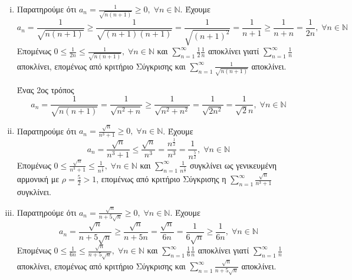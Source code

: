 \begin{enumerate}
\begin{enumerate}[i)]
        \item Παρατηρούμε ότι $ a_{n} = \frac{1}{\sqrt{n(n+1)}} \geq 0, \; \forall n 
            \in \mathbb{N} $. Έχουμε
            \[
                a_{n} = \frac{1}{\sqrt{n(n+1)}} \geq \frac{1}{\sqrt{(n+1)(n+1)}} = 
                \frac{1}{\sqrt{(n+1)^{2}} } = \frac{1}{n+1} \geq \frac{1}{n+n} = 
                \frac{1}{2n}, \; \forall n \in \mathbb{N}   
            \] 
            Επομένως $ 0 \leq \frac{1}{2n} \leq \frac{1}{\sqrt{n(n+1)}}, \; 
            \forall n \in \mathbb{N} $ και $ \sum_{n=1}^{\infty} \frac{1}{2} 
            \frac{1}{n} $ αποκλίνει γιατί $ \sum_{n=1}^{\infty} \frac{1}{n} $ 
            αποκλίνει, επομένως από κριτήριο Σύγκρισης και 
            $ \sum_{n=1}^{\infty} \frac{1}{\sqrt{n(n+1)}} $ αποκλίνει.

            \begin{rem}
                Ένας 2ος τρόπος
                \[
                    a_{n} = \frac{1}{\sqrt{n(n+1)}} = \frac{1}{\sqrt{n^{2}+n}} \geq 
                    \frac{1}{\sqrt{n^{2}+n^{2}}} = \frac{1}{\sqrt{2n^{2}}} = 
                    \frac{1}{\sqrt{2}n}, \; \forall n \in \mathbb{N}   
                \] 
            \end{rem}

        \item Παρατηρούμε ότι $ a_{n} = \frac{\sqrt{n}}{n^{3}+1} \geq 0, \; 
            \forall n \in \mathbb{N} $. Έχουμε
            \[
                a_{n} = \frac{\sqrt{n}}{n^{3}+1} \leq \frac{\sqrt{n}}{n^{3}} =
                \frac{n^{\frac{1}{2}}}{n^{3}} = \frac{1}{n^{\frac{5}{2}}}, \; 
                \forall n \in \mathbb{N}
            \] 
            Επομένως $ 0 \leq \frac{\sqrt{n}}{n^{3}+1} \leq \frac{1}{n^{\frac{5}{2}}}, 
            \; \forall n \in \mathbb{N}$ και $ \sum_{n=1}^{\infty} 
            \frac{1}{n^{\frac{5}{2} }}$ συγκλίνει ως γενικευμένη αρμονική με 
            $ \rho = \frac{5}{2} > 1 $, επομένως από κριτήριο Σύγκρισης η 
            $ \sum_{n=1}^{\infty} \frac{\sqrt{n}}{n^{3}+1} $ συγκλίνει.

        \item Παρατηρούμε ότι $ a_{n} = \frac{\sqrt{n}}{n + 5 \sqrt{n}} \geq 0, \; 
            \forall n \in \mathbb{N}$. Έχουμε
            \[
                a_{n} = \frac{\sqrt{n}}{n+ 5 \sqrt{n}} \geq \frac{\sqrt{n}}{n+ 5n} = 
                \frac{\sqrt{n}}{6n} = \frac{1}{6 \sqrt{n}} \geq \frac{1}{6n}, 
                \; \forall n \in \mathbb{N}
            \] 
            Επομένως $ 0 \leq \frac{1}{6n} \leq \frac{\sqrt{n}}{n+ 5 \sqrt{n}}, \; 
            \forall n \in \mathbb{N} $ και 
            $ \sum_{n=1}^{\infty} \frac{1}{6} \frac{1}{n} $ αποκλίνει γιατί 
            $ \sum_{n=1}^{\infty} \frac{1}{n} $ αποκλίνει, επομένως από κριτήριο 
            Σύγκρισης και $ \sum_{n=1}^{\infty} \frac{\sqrt{n}}{n+ 5 \sqrt{n}} $ 
            αποκλίνει.


\end{enumerate}
\end{enumerate}

